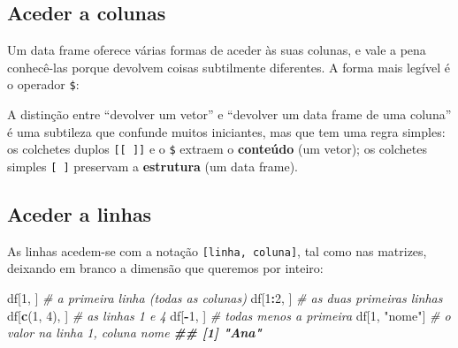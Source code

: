 \documentclass[
  portuguese,
  11pt,
  openany]{book}
\newenvironment{Shaded}{\begin{snugshade}}{\end{snugshade}}
\newcommand{\CommentTok}[1]{\textcolor[rgb]{0.56,0.35,0.01}{\textit{#1}}}
\newcommand{\DecValTok}[1]{\textcolor[rgb]{0.00,0.00,0.81}{#1}}
\newcommand{\DocumentationTok}[1]{\textcolor[rgb]{0.56,0.35,0.01}{\textbf{\textit{#1}}}}
\newcommand{\FunctionTok}[1]{\textcolor[rgb]{0.13,0.29,0.53}{\textbf{#1}}}
\newcommand{\NormalTok}[1]{#1}
\newcommand{\SpecialCharTok}[1]{\textcolor[rgb]{0.81,0.36,0.00}{\textbf{#1}}}
\newcommand{\StringTok}[1]{\textcolor[rgb]{0.31,0.60,0.02}{#1}}
\begin{document}
\subsection{Aceder a colunas}\label{aceder-a-colunas}

Um data frame oferece várias formas de aceder às suas colunas, e vale a pena
conhecê-las porque devolvem coisas subtilmente diferentes. A forma mais legível é
o operador \texttt{\$}:

\begin{Shaded}
\end{Shaded}

A distinção entre ``devolver um vetor'' e ``devolver um data frame de uma coluna'' é
uma subtileza que confunde muitos iniciantes, mas que tem uma regra simples: os
colchetes duplos \texttt{{[}{[}\ {]}{]}} e o \texttt{\$} extraem o \textbf{conteúdo} (um vetor); os colchetes
simples \texttt{{[}\ {]}} preservam a \textbf{estrutura} (um data frame).

\subsection{Aceder a linhas}\label{aceder-a-linhas}

As linhas acedem-se com a notação \texttt{{[}linha,\ coluna{]}}, tal como nas matrizes,
deixando em branco a dimensão que queremos por inteiro:

\begin{Shaded}
\begin{Highlighting}[]
\NormalTok{df[}\DecValTok{1}\NormalTok{, ]         }\CommentTok{\# a primeira linha (todas as colunas)}
\NormalTok{df[}\DecValTok{1}\SpecialCharTok{:}\DecValTok{2}\NormalTok{, ]       }\CommentTok{\# as duas primeiras linhas}
\NormalTok{df[}\FunctionTok{c}\NormalTok{(}\DecValTok{1}\NormalTok{, }\DecValTok{4}\NormalTok{), ]   }\CommentTok{\# as linhas 1 e 4}
\NormalTok{df[}\SpecialCharTok{{-}}\DecValTok{1}\NormalTok{, ]        }\CommentTok{\# todas menos a primeira}
\NormalTok{df[}\DecValTok{1}\NormalTok{, }\StringTok{"nome"}\NormalTok{]   }\CommentTok{\# o valor na linha 1, coluna \textquotesingle{}nome\textquotesingle{}}
\DocumentationTok{\#\# [1] "Ana"}
\end{Highlighting}
\end{Shaded}
\end{document}
